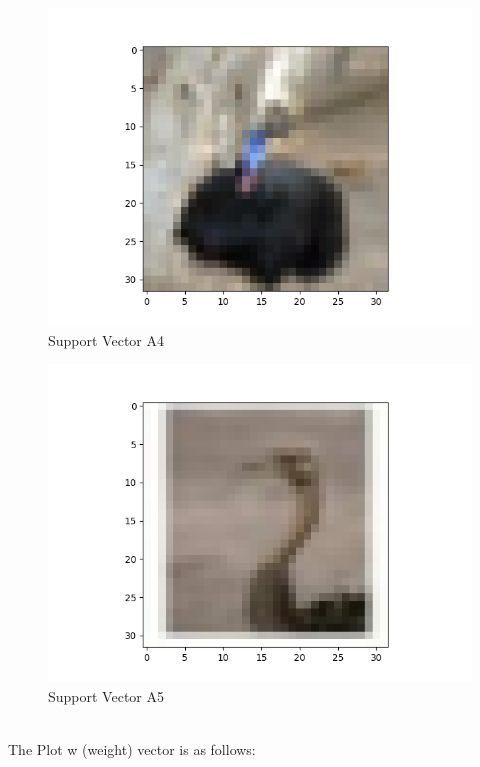 \documentclass[11pt]{article}
\begin{document}
\begin{figure}[H]
\begin{center}
  \includegraphics[scale=0.45]{a4.png}
  \caption{Support Vector A4}
  \label{fig2D}
\end{center}
\end{figure}
\begin{figure}[H]
\begin{center}
  \includegraphics[scale=0.45]{a5.png}
  \caption{Support Vector A5}
  \label{fig2E}
\end{center}
\end{figure}
\\
The Plot w (weight) vector is as follows:
\end{document}
